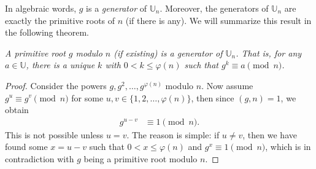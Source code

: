 \documentclass{subfile}
\begin{document}
In algebraic words, $g$ is a \textit{generator} of $\mathbb U_n$. Moreover, the generators of $\mathbb U_n$ are exactly the primitive roots of $n$ (if there is any). We will summarize this result in the following theorem.

	\begin{theorem}\slshape\label{thm:prequalsU}
		A primitive root $g$ modulo $n$ (if existing) is a generator of $\mathbb U_n$. That is, for any $a\in\mathbb{U}$, there is a unique $k$ with $0< k\leq\varphi(n)$ such that $g^k \equiv a \pmod n$.
	\end{theorem}

	\begin{proof}
		Consider the powers $g,g^2,\ldots,g^{\varphi (n)}$ modulo $n$. Now assume  $g^u  \equiv g^v \pmod n$ for some $u, v \in \{1,2,\ldots, \varphi(n)\}$, then since $(g,n)=1$, we obtain
			\begin{align*}
				g^{u-v}&\equiv1\pmod n.
			\end{align*}
		This is not possible unless $u=v$. The reason is simple: if $u \neq v$, then we have found some $x=u-v$ such that $0 < x \leq \varphi(n)$ and $g^x \equiv 1 \pmod n$, which is in contradiction with $g$ being a primitive root modulo $n$.
	\end{proof}
\end{document}
